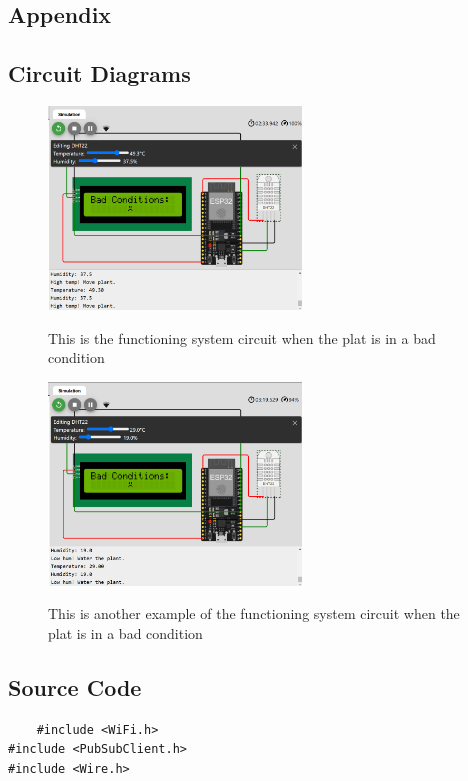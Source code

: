 \documentclass[12pt,a4paper,oneside,english]{book}
\begin{document}
\begin{appendix}
\chapter{Appendix}
\section{Circuit Diagrams}
\begin{figure}[!h]
\centering
\includegraphics[width=0.6\textwidth]{images/badcondition.png}\label{fig:badconditionn}
\caption{This is the functioning system circuit when the plat is in a bad condition}
\label{fig:exemple1}
\end{figure}

\begin{figure}[!h]
    \centering
    \includegraphics[width=0.6\textwidth]{images/badcondition2.png}\label{fig:badconditionn2}
    \caption{This is another example of the functioning system circuit when the plat is in a bad condition}
    \label{fig:exemple1}
\end{figure}

\section{Source Code}
\begin{lstlisting}
    #include <WiFi.h>
#include <PubSubClient.h>
#include <Wire.h>


\end{lstlisting}
\end{appendix}
\end{document}
